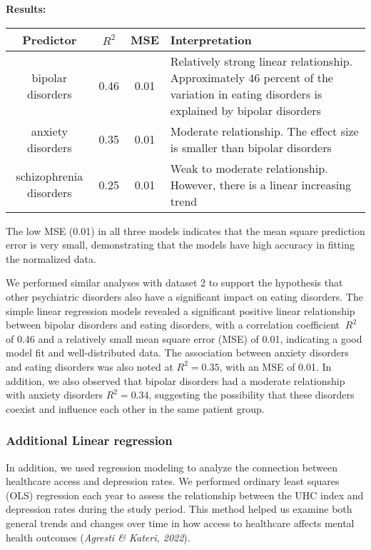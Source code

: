     \textbf{Results:}
    
    \begin{tabular}{||c c c p{10cm}||} 
    \hline
    \textbf{Predictor} & \textbf{$R^2$} & \textbf{MSE} & \textbf{Interpretation} \\
    \hline
    bipolar disorders &  0.46 & 0.01 & Relatively strong linear relationship. 
    Approximately 46 percent of the variation in eating disorders is explained by bipolar disorders \\ 
    \hline
    anxiety disorders &  0.35 & 0.01 & Moderate relationship. The effect size is smaller than bipolar disorders\\
    \hline
    schizophrenia disorders & 0.25 & 0.01 & Weak to moderate relationship. However, there is a linear increasing trend\\
    \hline
    \end{tabular}

The low MSE (0.01) in all three models indicates that the mean square prediction error is very small, demonstrating that the models have high accuracy in fitting the normalized data.

We performed similar analyses with dataset 2 to support the hypothesis that other psychiatric disorders also have a significant impact on eating disorders. The simple linear regression models revealed a significant positive linear relationship between bipolar disorders and eating disorders, with a correlation coefficient $\ R^2$ of 0.46 and a relatively small mean square error (MSE) of 0.01, indicating a good model fit and well-distributed data. The association between anxiety disorders and eating disorders was also noted at $R^2 = 0.35$, with an MSE of 0.01. In addition, we also observed that bipolar disorders had a moderate relationship with anxiety disorders $R^2 =0.34$, suggesting the possibility that these disorders coexist and influence each other in the same patient group.

\subsubsection{Additional Linear regression}

In addition, we used regression modeling to analyze the connection between healthcare access and depression rates. We performed ordinary least squares (OLS) regression each year to assess the relationship between the UHC index and depression rates during the study period. This method helped us examine both general trends and changes over time in how access to healthcare affects mental health outcomes (\textit{Agresti \& Kateri, 2022}).



